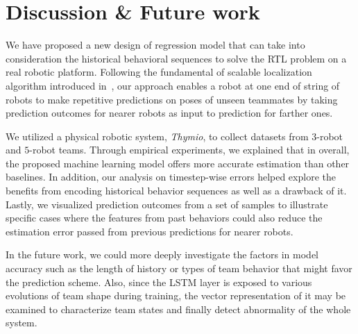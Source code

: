 \documentclass[letterpaper, 10 pt, conference]{ieeeconf}  %
\begin{document}
	\section{Discussion \& Future work}
	\label{sec:discussion_and_future_work}

	We have proposed a new design of regression model that can take into consideration
	the historical behavioral sequences to solve the RTL problem on a real robotic platform.
	Following the fundamental of scalable localization algorithm introduced in~\cite{CPR17},
	our approach enables a robot at one end of string of robots to make repetitive predictions
	on poses of unseen teammates by taking prediction outcomes for nearer robots as input to
	prediction for farther ones.

	We utilized a physical robotic system, \emph{Thymio}, to collect datasets from
	$3$-robot and $5$-robot teams. Through empirical experiments, we explained that in overall,
	the proposed machine learning model offers more accurate estimation than other baselines.
	In addition, our analysis on timestep-wise errors helped
	explore the benefits from encoding historical behavior sequences as well as a
	drawback of it. Lastly, we visualized prediction outcomes from a set of samples to
	illustrate specific cases where the features from past behaviors could also reduce the
	estimation error passed from previous predictions for nearer robots.

	In the future work, we could more deeply investigate the factors in model accuracy such as
	the length of history or types of team behavior that might favor the prediction scheme.
	Also, since the LSTM layer is exposed
	to various evolutions of team shape during training, the vector representation of it
	may be examined to characterize team states and finally detect abnormality of the whole
	system.


{\small
	
	
}
\end{document}
